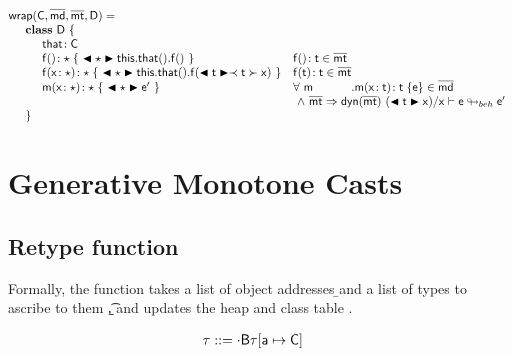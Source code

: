 \documentclass[a4paper,USenglish]{tex/lipics-v2016}
\begin{document}
\[\begin{array}{@{}ll@{}l@{}r@{~}c@{~}r}
\\
\wrapAny\C\bmd\bmt\D = \\
\SP \class~\D~\{\\
\SPP \Fdef \that \C\\ 
\SPP   \Mdefz\f\any{~\BehCast\any{\Get{{\Get\this\that}}\f}~}
&  \Mtype\f{}\t \in \bmt\\
\SPP   \Mdef\f\x\any\any{~\BehCast\any{\Set{\Get\this\that}\f{\bscast\t\x}}~}
&  \Mtype\f\t\t \in \bmt\\
\SPP   \Mdef\m\x\any\any {~\BehCast\any{{\ep}}~}
&  \All \m \Mdef\m\x\t\t\e\in\b\md \\
&\multicolumn{5}{l}{~\wedge~\rtranst{\bmt}{\dyn{\bmt}}{(\BehCast\t\x)}\x{\e}{\ep}}
\\
\SP \}\\
\end{array}\]


\normalsize

\section{Generative Monotone Casts}

\subsection{Retype function}\label{retype}

Formally, the  function takes a list of object
addresses \b\a and a list of types to ascribe to them \b\t, and updates the
heap \s and class table \K. 

\begin{align*}
\S &::= \cdot \B \Map\S{\Bind\a\C}
\end{align*}
\begin{mathpar}


\end{mathpar}
\end{document}
